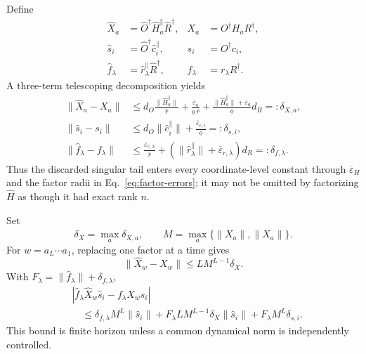 \documentclass[aps,prl,reprint,superscriptaddress,nofootinbib]{revtex4-2}
\newcommand{\eps}{\varepsilon}
\begin{document}
Define
\begin{align}
 \widehat X_a&=\widehat O^\dagger\widehat H_a^{\parallel}\widehat R^\dagger,
 &X_a&=O^\dagger H_aR^\dagger,\nonumber\\
 \widehat s_i&=\widehat O^\dagger\widehat c_i^{\parallel},
 &s_i&=O^\dagger c_i,\nonumber\\
 \widehat f_\lambda&=\widehat r_\lambda^{\parallel}\widehat R^\dagger,
 &f_\lambda&=r_\lambda R^\dagger.
 \label{eq:truncated-reconstruction}
\end{align}
A three-term telescoping decomposition yields
\begin{align}
 \|\widehat X_a-X_a\|
 &\le d_O\frac{\|\widehat H_a^{\parallel}\|}{\widehat r}
 +\frac{\overline\eps_a}{\underline o\,\widehat r}
 +\frac{\|\widehat H_a^{\parallel}\|+\overline\eps_a}{\underline o}d_R
 =:\delta_{X,a},
 \label{eq:shift-error}\\
 \|\widehat s_i-s_i\|
 &\le d_O\|\widehat c_i^{\parallel}\|
 +\frac{\overline\eps_{c,i}}{\underline o}
 =:\delta_{s,i},
 \label{eq:seed-error}\\
 \|\widehat f_\lambda-f_\lambda\|
 &\le\frac{\overline\eps_{r,\lambda}}{\widehat r}
 +(\|\widehat r_\lambda^{\parallel}\|+\overline\eps_{r,\lambda})d_R
 =:\delta_{f,\lambda}.
 \label{eq:readout-error}
\end{align}
Thus the discarded singular tail enters every coordinate-level constant through $\overline\eps_H$ and the factor radii in Eq.~\eqref{eq:factor-errors}; it may not be omitted by factorizing $\widehat H$ as though it had exact rank $n$.

Set
\begin{equation}
 \delta_X=\max_a\delta_{X,a},
 \qquad
 M=\max_a\{\|X_a\|,\|\widehat X_a\|\}.
 \label{eq:MX}
\end{equation}
For $w=a_L\cdots a_1$, replacing one factor at a time gives
\begin{equation}
 \|\widehat X_w-X_w\|\le L M^{L-1}\delta_X.
 \label{eq:word-telescope}
\end{equation}
With $F_\lambda=\|\widehat f_\lambda\|+\delta_{f,\lambda}$,
\begin{align}
 &|\widehat f_\lambda\widehat X_w\widehat s_i-f_\lambda X_ws_i|\nonumber\\
 &\quad\le
 \delta_{f,\lambda}M^L\|\widehat s_i\|
 +F_\lambda L M^{L-1}\delta_X\|\widehat s_i\|
 +F_\lambda M^L\delta_{s,i}.
 \label{eq:prediction-bound}
\end{align}
This bound is finite horizon unless a common dynamical norm is independently controlled.
\end{document}
